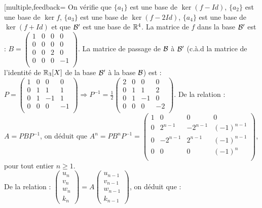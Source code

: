 \begin{multi}[multiple,feedback=
{On vérifie que 
\(\{a_1\}\) est une base de \(\ker (f-Id)\),  \(\{a_2\}\) est une base de \(\ker f\), \(\{a_3 \}\) est une base de \(\ker (f-2Id)\),   \(\{a_4\}\) est une base de \(\ker (f+Id)\) et que \({\cal B}'\) est une base de \(\mathbb{R}^4\).
\vskip0mm
La matrice de \(f\) dans la base \({\cal B}'\) est :
\(B= \left(\begin{array}{rccc}
1&0&0&0\\
0&0&0&0\\ 
0&0&2&0\\
0&0&0&-1\\
\end{array}\right)\).
\vskip0mm
La matrice de passage de  \({\cal B}\) à   \({\cal B}'\) (c.à.d la matrice de l'identité de \(\mathbb{R}_3[X]\) de 
la base \({\cal B}'\) à la base \({\cal B}\)) 
est : \(P= \left(\begin{array}{rccc} 1&0&0&0\\
0&1&1&1\\ 
0&1&-1&1\\ 0&0&0&-1\\
\end{array}\right)\Rightarrow \displaystyle P^{-1}= \frac{1}{2}\left(\begin{array}{rccc}
2&0&0&0\\
0&1&1&2\\ 
0&1&-1&0\\
0&0&0&-2\\
\end{array}\right).\) 
\vskip0mm
De la relation : \(A=PBP^{-1}\), on déduit que 
\(A^n= PB^nP^{-1}=\left(\begin{array}{rccc}
1&0&0&0\\
0 &2^{n-1}&-2^{n-1}&(-1)^{n-1}\\ 
0 &-2^{n-1}&2^{n-1}&(-1)^{n-1}\\ 
0 &0&0&(-1)^n\\ 
\end{array}\right)\), pour tout entier \(n\ge 1\).\\
De la relation : \(\left(\begin{array}{r}u_n\\v_n\\ w_n\\k_n\end{array}\right) = A  \left(\begin{array}{r}
u_{n-1}\\v_{n-1}\\ w_{n-1}\\k_{n-1}\end{array}\right)\), on déduit que : 
}
\end{multi}
